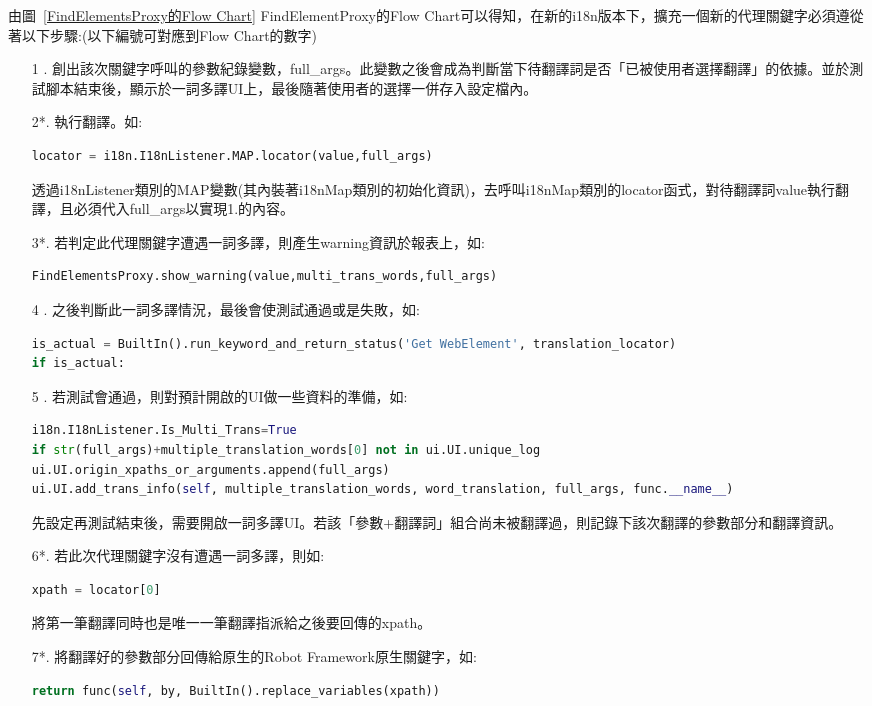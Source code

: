 由圖~\ref{FindElementsProxy的Flow Chart} FindElementProxy的Flow Chart可以得知，在新的i18n版本下，擴充一個新的代理關鍵字必須遵從著以下步驟:(以下編號可對應到Flow Chart的數字)
\begin{itemize}
\item[1 .]創出該次關鍵字呼叫的參數紀錄變數，full\_args。此變數之後會成為判斷當下待翻譯詞是否「已被使用者選擇翻譯」的依據。並於測試腳本結束後，顯示於一詞多譯UI上，最後隨著使用者的選擇一併存入設定檔內。

\item[2*.]執行翻譯。如:
\begin{lstlisting}[language={python}]
locator = i18n.I18nListener.MAP.locator(value,full_args)
\end{lstlisting}
透過i18nListener類別的MAP變數(其內裝著i18nMap類別的初始化資訊)，去呼叫i18nMap類別的locator函式，對待翻譯詞value執行翻譯，且必須代入full\_args以實現1.的內容。

\item[3*.]若判定此代理關鍵字遭遇一詞多譯，則產生warning資訊於報表上，如:
\begin{lstlisting}[language={python}]
FindElementsProxy.show_warning(value,multi_trans_words,full_args)
\end{lstlisting}

\item[4 .]之後判斷此一詞多譯情況，最後會使測試通過或是失敗，如:
\begin{lstlisting}[language={python}]
is_actual = BuiltIn().run_keyword_and_return_status('Get WebElement', translation_locator)
if is_actual:
\end{lstlisting}

\item[5 .]若測試會通過，則對預計開啟的UI做一些資料的準備，如:
\begin{lstlisting}[language={python}]
i18n.I18nListener.Is_Multi_Trans=True
if str(full_args)+multiple_translation_words[0] not in ui.UI.unique_log
ui.UI.origin_xpaths_or_arguments.append(full_args)
ui.UI.add_trans_info(self, multiple_translation_words, word_translation, full_args, func.__name__)
\end{lstlisting}
先設定再測試結束後，需要開啟一詞多譯UI。若該「參數+翻譯詞」組合尚未被翻譯過，則記錄下該次翻譯的參數部分和翻譯資訊。

\item[6*.]若此次代理關鍵字沒有遭遇一詞多譯，則如:
\begin{lstlisting}[language={python}]
xpath = locator[0]
\end{lstlisting}
將第一筆翻譯同時也是唯一一筆翻譯指派給之後要回傳的xpath。

\item[7*.]將翻譯好的參數部分回傳給原生的Robot Framework原生關鍵字，如:
\begin{lstlisting}[language={python}]
return func(self, by, BuiltIn().replace_variables(xpath))
\end{lstlisting}
\end{itemize}

